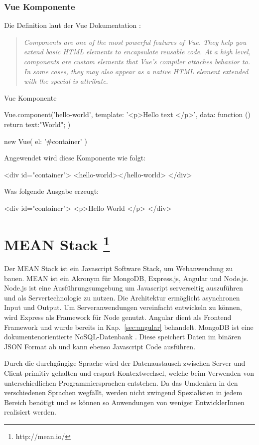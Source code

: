 \subsubsection{Vue Komponente}
Die Definition laut der Vue Dokumentation \cite{vue-component}: 
\begin{quote}
	\begin{english}
		\textit{Components are one of the most powerful features of Vue. They help you extend basic HTML elements to encapsulate reusable code. At a high level, components are custom elements that Vue’s compiler attaches behavior to. In some cases, they may also appear as a native HTML element extended with the special is attribute.}
	\end{english}
\end{quote}

\begin{program}[!htbp]
\caption{Vue Komponente}
\begin{JsCode}
	Vue.component('hello-world', {
		template: '<p>Hello {{ text }} </p>',
		data: function () {
			return {text:"World"};
		}
	})

	new Vue({
		el: '#container'
	})
\end{JsCode}
\end{program}

Angewendet wird diese Komponente wie folgt:
\begin{JsCode}[numbers=none]
<div id="container">
	<hello-world></hello-world>
</div>
\end{JsCode}

Was folgende Ausgabe erzeugt:
\begin{JsCode}[numbers=none]
<div id="container">
	<p>Hello World </p>
</div>
\end{JsCode}

\section%
{MEAN Stack%
	\protect\footnote{http://mean.io/}}%
\label{cha:mean-stack}
Der MEAN Stack ist ein Javascript Software Stack, um Webanwendung zu bauen. MEAN ist ein Akronym für MongoDB, Express.js, Angular und Node.js. 
Node.js ist eine Ausführungsumgebung um Javascript serverseitig auszuführen und als Servertechnologie zu nutzen. Die Architektur ermöglicht asynchronen Input und Output. Um Serveranwendungen vereinfacht entwickeln zu können, wird Express als Framework für Node genutzt. 
Angular dient als Frontend Framework und wurde bereits in Kap.~\ref{sec:angular} behandelt. MongoDB ist eine dokumentenorientierte NoSQL-Datenbank \cite{noSQL}. Diese speichert Daten im binären JSON Format ab und kann ebenso Javascript Code ausführen.

Durch die durchgängige Sprache wird der Datenaustausch zwischen Server und Client primitiv gehalten und erspart Kontextwechsel, welche beim Verwenden von unterschiedlichen Programmiersprachen entstehen. Da das Umdenken in den verschiedenen Sprachen wegfällt, werden nicht zwingend Spezialisten in jedem Bereich benötigt und es können so Anwendungen von weniger EntwicklerInnen realisiert werden. 
